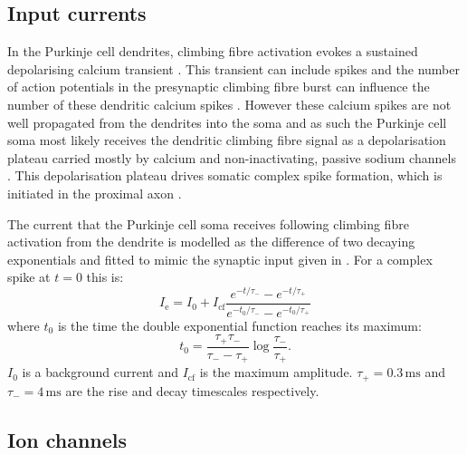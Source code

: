 \documentclass[twocolumn]{svjour3}          %
\newcommand{\mse}{\,\mathrm{ms}}
\begin{document}
\subsection{Input currents}

In the Purkinje cell dendrites, climbing fibre activation evokes a
sustained depolarising calcium transient
\citep{KitamuraHaeusser2011}. This transient can include spikes and the
number of action potentials in the presynaptic climbing fibre burst can influence
the number of these dendritic calcium spikes
\citep{LlinasSugimori1980a,KitamuraHaeusser2011,DavieEtAl2008,MathyEtAl2009}. However
these calcium spikes are not well propagated from the dendrites into
the soma \citep{DavieEtAl2008} and as such the Purkinje cell soma most
likely receives the dendritic climbing fibre signal as a
depolarisation plateau carried mostly by calcium and non-inactivating, passive sodium
channels
\citep{LlinasSugimori1980b,KnopfelEtAl1990,LlinasNicholson1971,StuartHausser1994}. This
depolarisation plateau drives somatic complex spike formation, which
is initiated in the proximal axon \citep{StuartHausser1994,DavieEtAl2008,PalmerEtAl2010}. 

The current that the Purkinje cell soma receives following climbing
fibre activation from the dendrite is modelled as the difference of
two decaying exponentials and fitted to mimic the synaptic input given
in \citet{DavieEtAl2008}. For a complex spike at $t=0$ this is:
\begin{equation}
\label{eq:I_synapse}
I_{\mathrm{e}} = I_0+I_{\mathrm{cf}}\frac{e^{-t/\tau_-}-e^{-t/\tau_+}}{e^{-t_0/\tau_-}-e^{-t_0/\tau_+}}
\end{equation}
where $t_0$ is the time the double exponential function reaches its maximum:
\begin{equation}
t_0 = \frac{\tau_+\tau_-} {\tau_--\tau_+}\log{\frac{\tau_-}{\tau_+}}.
\end{equation}
$I_0$ is a background current and $I_{\mathrm{cf}}$ is the maximum
amplitude. $\tau_+=0.3\mse$ and $\tau_-=4\mse$ are the rise and decay
timescales respectively.

\subsection{Ion channels}
\end{document}

